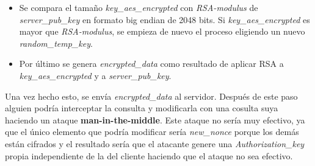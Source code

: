 \begin{enumerate}
\begin{enumerate}
\begin{itemize}
	\item Se compara el tamaño \emph{key\_aes\_encrypted} con \emph{RSA-modulus} de \emph{server\_pub\_key} en formato big endian de 2048 bits. Si \emph{key\_aes\_encrypted} es mayor que \emph{RSA-modulus}, se empieza de nuevo el proceso eligiendo un nuevo \emph{random\_temp\_key}.
	\item Por último se genera \emph{encrypted\_data} como resultado de aplicar RSA a \emph{key\_aes\_encrypted} y a \emph{server\_pub\_key}.
		\end{itemize}
	\end{enumerate}
	Una vez hecho esto, se envía \emph{encrypted\_data} al servidor.
	Después de este paso alguien podría interceptar la consulta y modificarla con una cosulta suya haciendo un ataque \textbf{man-in-the-middle}. 
	Este ataque no sería muy efectivo, ya que el único elemento que podría modificar sería \emph{new\_nonce} porque los demás están cifrados y el resultado sería que el atacante genere una \emph{Authorization\_key} propia independiente de la del cliente haciendo que el ataque no sea efectivo.


\end{enumerate}
